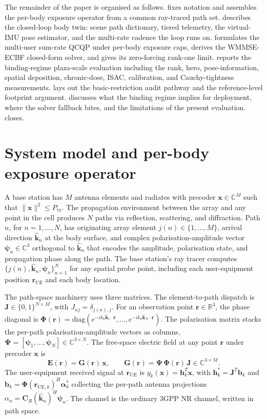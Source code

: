 \documentclass[journal,twocolumn,10pt]{IEEEtran}
\theoremstyle{plain}
\theoremstyle{remark}
\newcommand{\khat}{\hat{\bm{k}}}
\newcommand{\rr}{\mathbf{r}}
\newcommand{\xx}{\mathbf{x}}
\newcommand{\hh}{\mathbf{h}}
\newcommand{\bvec}{\mathbf{b}}
\newcommand{\GG}{\mathbf{G}}
\newcommand{\Jmat}{\mathbf{J}}
\newcommand{\Phimat}{\mathbf{\Phi}}
\newcommand{\Psimat}{\bm{\Psi}}
\newcommand{\psin}{\bm{\psi}_n}
\newcommand{\Complex}{\mathbb{C}}
\begin{document}
The remainder of the paper is organised as follows.
 fixes notation and assembles the per-body exposure
operator from a common ray-traced path set.  describes
the closed-loop body twin: scene path dictionary, tiered telemetry,
the virtual-IMU pose estimator, and the multi-rate cadence the loop
runs on.  formulates the multi-user sum-rate
QCQP under per-body exposure caps, derives the WMMSE-ECBF closed-form
solver, and gives its zero-forcing rank-one limit.
 reports the binding-regime plaza-scale evaluation
including the rank, hero, pose-information, spatial deposition,
chronic-dose, ISAC, calibration, and Cauchy-tightness measurements.
 lays out the basic-restriction audit pathway
and the reference-level footprint argument. 
discusses what the binding regime implies for deployment, where the
solver fallback bites, and the limitations of the present
evaluation.  closes.


\section{System model and per-body exposure operator}\label{sec:setup}

A base station has $M$ antenna elements and radiates with precoder
$\xx \in \Complex^M$ such that $\|\xx\|^2 \leq P_{\mathrm{tx}}$. The
propagation environment between the array and any point in the cell
produces $N$ paths via reflection, scattering, and diffraction. Path
$n$, for $n = 1, \ldots, N$, has originating array element
$j(n) \in \{1, \ldots, M\}$, arrival direction $\khat_n$ at the
body surface, and complex polarisation-amplitude vector
$\psin \in \Complex^3$ orthogonal to $\khat_n$ that encodes the
amplitude, polarisation state, and propagation phase along the path.
The base station's ray tracer computes
$\{j(n), \khat_n, \psin\}_{n=1}^N$ for any spatial probe point,
including each user-equipment position $\rr_{\mathrm{UE}}$ and each
body location.

The path-space machinery uses three matrices. The element-to-path
dispatch is $\Jmat \in \{0, 1\}^{N \times M}$, with
$J_{nj} = \delta_{j(n), j}$. For an observation point
$\rr \in \mathbb{R}^3$, the phase diagonal is
$\Phimat(\rr) = \mathrm{diag}(e^{-i k_0 \khat_1 \cdot \rr}, \ldots,
e^{-i k_0 \khat_N \cdot \rr})$. The polarisation matrix stacks the
per-path polarisation-amplitude vectors as columns,
$\Psimat = [\bm\psi_1, \ldots, \bm\psi_N] \in \Complex^{3 \times N}$.
The free-space electric field at any point $\rr$ under precoder $\xx$
is
\begin{equation}\label{eq:E-decomp}
  \mathbf{E}(\rr) = \GG(\rr)\,\xx,
  \qquad
  \GG(\rr) = \Psimat\,\Phimat(\rr)\,\Jmat \in \Complex^{3 \times M}.
\end{equation}
The user-equipment received signal at $\rr_{\mathrm{UE}}$ is
$y_k(\xx) = \hh_k^T \xx$, with $\hh_k^* = \Jmat^T \bvec_k$ and
$\bvec_k = \Phimat(\rr_{\mathrm{UE},k})^H \bm\alpha_k^*$ collecting
the per-path antenna projections
$\alpha_n = \mathbf{C}_R(\khat_n)^H \psin$. The channel is the
ordinary 3GPP NR channel, written in path space.
\end{document}
